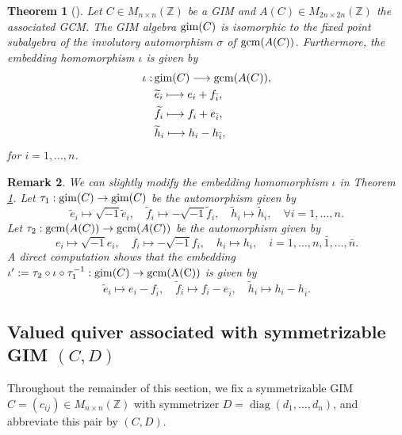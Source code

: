 \documentclass[12pt,reqno]{amsart}
\numberwithin{equation}{section}
\newtheorem{theorem}{Theorem}[section]
\newtheorem{remark}[theorem]{Remark}
\begin{document}
	
	\begin{theorem}[\cite{B89-GIM-alg}]\label{thm:GIM-Kac-Moody}
		Let $C\in M_{n\times n}(\mathbb{Z})$ be a GIM and $A(C)\in M_{2n\times 2n}(\mathbb{Z})$ the associated GCM. The GIM algebra ${\rm gim}(C)$ is isomorphic to the fixed point subalgebra of the involutory automorphism $\sigma$ of ${\rm gcm}(A(C))$. Furthermore, the embedding homomorphism $\iota$ is given by
		\begin{align*}
			\iota:\, &{\rm gim}(C) \longrightarrow {\rm gcm}(A(C)),
			\\
			&\widetilde{e}_i \longmapsto e_i+f_{\bar i},\\
			&\widetilde{f}_i \longmapsto f_i+e_{\bar i},\\
			&\widetilde{h}_i \longmapsto h_i-h_{\bar i},  
		\end{align*}
		for $i=1,\dots, n$.
	\end{theorem}
	\begin{remark}\label{rem:twisted-embedding}
		We can slightly modify the embedding homomorphism $\iota$ in Theorem \ref{thm:GIM-Kac-Moody}. 
		Let $\tau_{1}:{\rm gim}(C)\rightarrow {\rm gim}(C)$ be the automorphism given by \[\tilde{e}_i\mapsto\sqrt{-1}\tilde{e}_i,\quad \tilde{f}_i\mapsto -\sqrt{-1}\tilde{f}_i, \quad \tilde{h}_i\mapsto \tilde{h}_i, \quad\forall i=1,\ldots, n.\] Let $\tau_2:{\rm gcm}(A(C))\rightarrow {\rm gcm}(A(C))$ be the automorphism given by 
		\[
		e_i\mapsto \sqrt{-1}e_i,\quad f_i\mapsto -\sqrt{-1}f_i,\quad h_i\mapsto h_i,\quad i=1,\ldots,n,\bar{1},\ldots, \bar{n}.
		\]
		A direct computation shows that  the embedding $\iota':=\tau_2\circ \iota\circ \tau_1^{-1}:{\rm gim}(C)\to {\rm gcm(A(C))}$ is given by 
		\[
		\widetilde{e}_i \longmapsto e_i-f_{\bar i}, \quad \widetilde{f}_i \longmapsto f_i-e_{\bar i},\quad \widetilde{h}_i \longmapsto h_i-h_{\bar i}.
		\]
		
	\end{remark}
	
	\subsection{Valued quiver associated with symmetrizable GIM $(C,D)$}\label{ss:valued-quiver-(C,D)} Throughout the remainder of this section, we fix a symmetrizable GIM
	$C=(c_{ij})\in M_{n\times n}(\mathbb{Z})$ with symmetrizer
	$D=\operatorname{diag}(d_1,\ldots,d_n)$, and abbreviate this pair by $(C,D)$.
	
\end{document}
